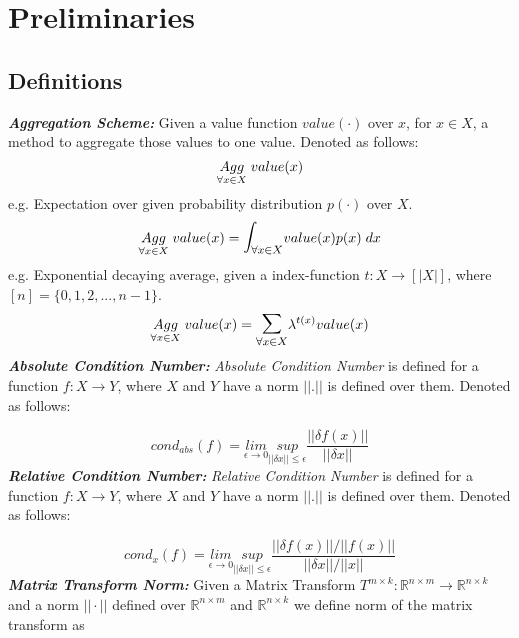 \section{Preliminaries}
\subsection{Definitions}

\textbf{\textit{Aggregation Scheme:}} Given a value function $value(\cdot)$ over $x$, for $x \in X$, a method to aggregate those values to one value. Denoted as follows:
\begin{equation}
\underset{\forall x\in X}{Agg}\hspace{1mm} value(x)
\end{equation}
e.g. Expectation over given probability distribution $p(\cdot)$ over $X$.
\begin{equation}
\underset{\forall x\in X}{Agg}\hspace{1mm} value(x) = \mathlarger{\mathlarger{\int}}_{\forall x\in X} value(x)p(x)\hspace{1mm}dx
\end{equation}
e.g. Exponential decaying average, given a index-function $t:X\to[|X|]$, where $[n] = \{0,1,2,...,n-1\}$.
\begin{equation}
\underset{\forall x\in X}{Agg}\hspace{1mm} value(x) = \mathlarger{\mathlarger{\sum}}_{\forall x\in X} \lambda^{t(x)}value(x)
\end{equation}
\newline
\textbf{\textit{Absolute Condition Number:}} \textit{Absolute Condition Number} is defined for a function $f: X \to Y$, where $X$ and $Y$ have a norm $||.||$ is defined over them. Denoted as follows:

\begin{equation} \label{def_cond_abs}
cond_{abs}(f) = \underset{\epsilon \to 0}{lim}\underset{||\delta x||\le \epsilon}{sup} \frac{||\delta f(x)||}{||\delta x||}
\end{equation}
\newline
\textbf{\textit{Relative Condition Number:}} \textit{Relative Condition Number} is defined for a function $f: X \to Y$, where $X$ and $Y$ have a norm $||.||$ is defined over them. Denoted as follows:

\begin{equation} \label{def_cond_rel}
cond_{x}(f) = \underset{\epsilon \to 0}{lim}\underset{||\delta x||\le \epsilon}{sup} \frac{||\delta f(x)||/||f(x)||}{||\delta x||/||x||}
\end{equation}
\newline
\textbf{\textit{Matrix Transform Norm:}} Given a Matrix Transform $T^{m\times k}: \mathbb{R}^{n\times m} \to \mathbb{R}^{n\times k}$ and a norm $||\cdot||$ defined over $\mathbb{R}^{n\times m}$ and $\mathbb{R}^{n\times k}$ we define norm of the matrix transform as 

